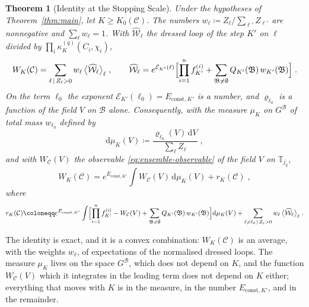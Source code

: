 \documentclass[11pt]{preprint}
\newcommand{\dd}{\mathrm{d}}
\numberwithin{equation}{section}
\newtheorem{theorem}{Theorem}[section]
\theoremstyle{definition}
\theoremstyle{remark}
\theoremstyle{plain}
\begin{document}
\begin{theorem}[Identity at the Stopping Scale]\label{thm:stopping-identity}
Under the hypotheses of Theorem~\ref{thm:main}, let $K \geq K_0(\mathcal C)$. The numbers $w_\ell \coloneqq Z_\ell/\sum_{\ell'}Z_{\ell'}$ are nonnegative and $\sum_\ell w_\ell = 1$. With $\widehat{\mathcal W}_\ell$ the dressed loop of the step $K'$ on $\ell$ divided by $\prod_i\kappa^{(q)}_K(C_i, \chi_i)$,
\begin{equation}\label{eq:stopping-identity}
    W_K(\mathcal C) = \sum_{\ell \,|\, Z_\ell > 0}w_\ell\,\bigl\langle\widehat{\mathcal W}_\ell\bigr\rangle_\ell\;,
    \qquad
    \widehat{\mathcal W}_\ell = e^{\mathcal E_{K'}(\ell)}\Bigl[\prod_{i=1}^{n}f^{(i)}_{K'} + \sum_{\mathfrak B \neq \emptyset}Q_{K'}(\mathfrak B)\,w_{K'}(\mathfrak B)\Bigr]\;.
\end{equation}
On the term $\ell_0$ the exponent $\mathcal E_{K'}(\ell_0) = E_{\mathrm{const},K'}$ is a number, and $\varrho_{\ell_0}$ is a function of the field $V$ on $\mathcal B$ alone. Consequently, with the measure $\mu_K$ on $G^{\mathcal B}$ of total mass $w_{\ell_0}$ defined by
\begin{equation}\label{eq:stopping-measure}
    \dd\mu_K(V) \coloneqq \frac{\varrho_{\ell_0}(V)\,\dd V}{\sum_\ell Z_\ell}\;,
\end{equation}
and with $W_{\mathcal C}(V)$ the observable \eqref{eq:ensemble-observable} of the field $V$ on $\mathbb T_{j_q}$,
\begin{equation}\label{eq:stopping-identity-leading}
    W_K(\mathcal C) = e^{E_{\mathrm{const},K'}}\int W_{\mathcal C}(V)\,\dd\mu_K(V) + r_K(\mathcal C)\;,
\end{equation}
where
\begin{equation}\label{eq:stopping-remainder}
    r_K(\mathcal C) \coloneqq e^{E_{\mathrm{const},K'}}\int\Bigl[\prod_{i=1}^{n}f^{(i)}_{K'} - W_{\mathcal C}(V) + \sum_{\mathfrak B \neq \emptyset}Q_{K'}(\mathfrak B)\,w_{K'}(\mathfrak B)\Bigr]\dd\mu_K(V) + \sum_{\ell \neq \ell_0 \,|\, Z_\ell > 0}w_\ell\,\bigl\langle\widehat{\mathcal W}_\ell\bigr\rangle_\ell\;.
\end{equation}
\end{theorem}

The identity is exact, and it is a convex combination: $W_K(\mathcal C)$ is an average, with the weights $w_\ell$, of expectations of the normalised dressed loops. The measure $\mu_K$ lives on the space $G^{\mathcal B}$, which does not depend on $K$, and the function $W_{\mathcal C}(V)$ which it integrates in the leading term does not depend on $K$ either; everything that moves with $K$ is in the measure, in the number $E_{\mathrm{const},K'}$, and in the remainder.
\end{document}
